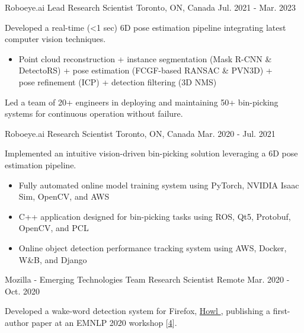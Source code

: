 \begin{cventries}
{\begin{cvitems}
\end{cvitems}
}
\cventry
{Roboeye.ai} %
{Lead Research Scientist} %
{Toronto, ON, Canada} %
{Jul. 2021 - Mar. 2023} %
{ %
\begin{cvitems}
\item {Developed a real-time (<1 sec) 6D pose estimation pipeline integrating latest computer vision techniques.}
\begin{itemize}[label=$\cdot$,leftmargin=0.7em]
\item{Point cloud reconstruction + instance segmentation (Mask R-CNN \& DetectoRS) + pose estimation (FCGF-based RANSAC \& PVN3D) + \\
pose refinement (ICP) + detection filtering (3D NMS)}
\end{itemize}
\item {Led a team of 20+ engineers in deploying and maintaining 50+ bin-picking systems for continuous operation without failure.}
\end{cvitems}
}
\cventry
{Roboeye.ai} %
{Research Scientist} %
{Toronto, ON, Canada} %
{Mar. 2020 - Jul. 2021} %
{ %
\begin{cvitems}
\item {Implemented an intuitive vision-driven bin-picking solution leveraging a 6D pose estimation pipeline.}
\begin{itemize}[label=$\cdot$,leftmargin=0.7em]
\item {Fully automated online model training system using PyTorch, NVIDIA Isaac Sim, OpenCV, and AWS}
\item {C++ application designed for bin-picking tasks using ROS, Qt5, Protobuf, OpenCV, and PCL}
\item {Online object detection performance tracking system using AWS, Docker, W\&B, and Django}
\end{itemize}
\end{cvitems}
}
\cventry
{Mozilla - Emerging Technologies Team} %
{Research Scientist} %
{Remote} %
{Mar. 2020 - Oct. 2020} %
{ %
\begin{cvitems}
\item {Developed a wake-word detection system for Firefox, \href{https://github.com/castorini/howl}{Howl {\small \faGithub}}, publishing a first-author paper at an EMNLP 2020 workshop [\hyperlink{howl:EMNLP}{4}].}

\end{cvitems}}
\end{cventries}
